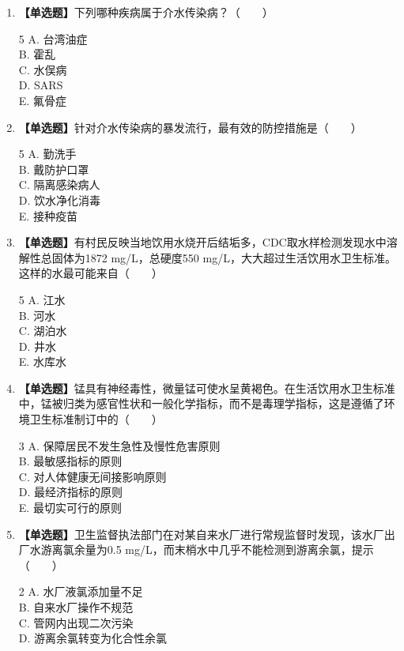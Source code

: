 \documentclass[10pt,a4paper,oneside]{ctexbook}
\begin{document}
\begin{enumerate}[leftmargin=*, itemsep=8pt]
    \item \textbf{【单选题】}下列哪种疾病属于介水传染病？（~~~~）
    \begin{multicols}{5}
    A. 台湾油症 \\
    B. 霍乱 \\
    C. 水俣病 \\
    D. SARS \\
    E. 氟骨症
    \end{multicols}
    \item \textbf{【单选题】}针对介水传染病的暴发流行，最有效的防控措施是（~~~~）
    \begin{multicols}{5}
    A. 勤洗手 \\
    B. 戴防护口罩 \\
    C. 隔离感染病人 \\
    D. 饮水净化消毒 \\
    E. 接种疫苗
    \end{multicols}
    \item \textbf{【单选题】}有村民反映当地饮用水烧开后结垢多，CDC取水样检测发现水中溶解性总固体为1872 mg/L，总硬度550 mg/L，大大超过生活饮用水卫生标准。这样的水最可能来自（~~~~）
    \begin{multicols}{5}
    A. 江水 \\
    B. 河水 \\
    C. 湖泊水 \\
    D. 井水 \\
    E. 水库水
    \end{multicols}
    \item \textbf{【单选题】}锰具有神经毒性，微量锰可使水呈黄褐色。在生活饮用水卫生标准中，锰被归类为感官性状和一般化学指标，而不是毒理学指标，这是遵循了环境卫生标准制订中的（~~~~）
    \begin{multicols}{3}
    A. 保障居民不发生急性及慢性危害原则 \\
    B. 最敏感指标的原则 \\
    C. 对人体健康无间接影响原则 \\
    D. 最经济指标的原则 \\
    E. 最切实可行的原则
    \end{multicols}
    \item \textbf{【单选题】}卫生监督执法部门在对某自来水厂进行常规监督时发现，该水厂出厂水游离氯余量为0.5 mg/L，而末梢水中几乎不能检测到游离余氯，提示（~~~~）
    \begin{multicols}{2}
    A. 水厂液氯添加量不足 \\
    B. 自来水厂操作不规范 \\
    C. 管网内出现二次污染 \\
    D. 游离余氯转变为化合性余氯
    \end{multicols}
\end{enumerate}
\end{document}
